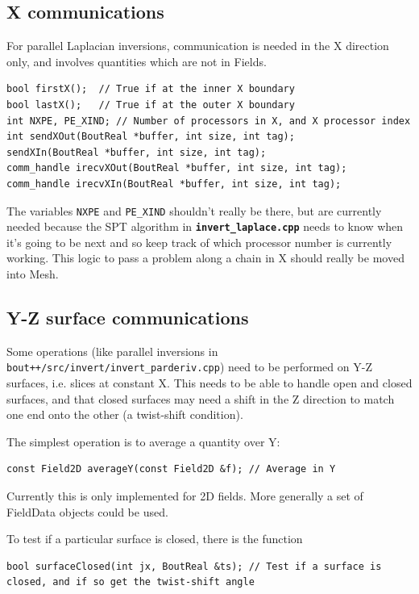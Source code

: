 \documentclass[12pt]{article}
\newcommand{\code}[1]{\texttt{#1}}
\newcommand{\file}[1]{\texttt{\bf #1}}
\begin{document}
\subsection{X communications}

For parallel Laplacian inversions, communication is needed in the X
direction only, and involves quantities which are not in Fields.

\begin{lstlisting}
bool firstX();  // True if at the inner X boundary
bool lastX();   // True if at the outer X boundary
int NXPE, PE_XIND; // Number of processors in X, and X processor index
int sendXOut(BoutReal *buffer, int size, int tag);
sendXIn(BoutReal *buffer, int size, int tag);
comm_handle irecvXOut(BoutReal *buffer, int size, int tag);
comm_handle irecvXIn(BoutReal *buffer, int size, int tag);
\end{lstlisting}

The variables \code{NXPE} and \code{PE\_XIND} shouldn't really be there,
but are currently needed because the SPT algorithm in \file{invert\_laplace.cpp}
needs to know when it's going to be next and so keep track of which processor
number is currently working. This logic to pass a problem along a chain in
X should really be moved into Mesh.

\subsection{Y-Z surface communications}

Some operations (like parallel inversions in \texttt{bout++/src/invert/invert\_parderiv.cpp}) need to be performed on
Y-Z surfaces, i.e. slices at constant X. This needs to be able to
handle open and closed surfaces, and that closed surfaces may need a 
shift in the Z direction to match one end onto the other (a twist-shift
condition).

The simplest operation is to average a quantity over Y:
\begin{lstlisting}
const Field2D averageY(const Field2D &f); // Average in Y
\end{lstlisting}
Currently this is only implemented for 2D fields. More generally a 
set of FieldData objects could be used.

To test if a particular surface is closed, there is the function
\begin{lstlisting}
bool surfaceClosed(int jx, BoutReal &ts); // Test if a surface is closed, and if so get the twist-shift angle
\end{lstlisting}
\end{document}
